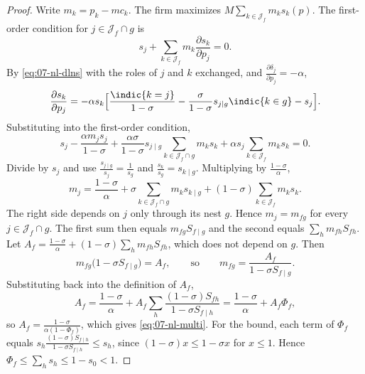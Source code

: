 \begin{proof}
Write $m_k = p_k - mc_k$. The firm maximizes $M\sum_{k\in\mathcal{J}_f}m_ks_k(p)$. The first-order condition for
$j \in \mathcal{J}_f \cap g$ is
\begin{equation*}
s_j + \sum_{k \in \mathcal{J}_f}m_k\frac{\partial s_k}{\partial p_j} = 0 .
\end{equation*}
By \eqref{eq:07-nl-dlns} with the roles of $j$ and $k$ exchanged, and $\frac{\partial\delta_j}{\partial p_j} = -\alpha$,
\begin{equation*}
\frac{\partial s_k}{\partial p_j} = -\alpha s_k\Big[\frac{\indic\{k = j\}}{1-\sigma} - \frac{\sigma}{1-\sigma}s_{j \mid g}\indic\{k \in g\} - s_j\Big] .
\end{equation*}
Substituting into the first-order condition,
\begin{equation*}
s_j - \frac{\alpha m_js_j}{1-\sigma} + \frac{\alpha\sigma}{1-\sigma}s_{j \mid g}\sum_{k\in\mathcal{J}_f\cap g}m_ks_k
+ \alpha s_j\sum_{k\in\mathcal{J}_f}m_ks_k = 0 .
\end{equation*}
Divide by $s_j$ and use $\frac{s_{j \mid g}}{s_j} = \frac{1}{s_g}$ and $\frac{s_k}{s_g} = s_{k \mid g}$. Multiplying by
$\frac{1-\sigma}{\alpha}$,
\begin{equation*}
m_j = \frac{1-\sigma}{\alpha} + \sigma\sum_{k\in\mathcal{J}_f\cap g}m_ks_{k \mid g} + (1-\sigma)\sum_{k\in\mathcal{J}_f}m_ks_k .
\end{equation*}
The right side depends on $j$ only through its nest $g$. Hence $m_j = m_{fg}$ for every
$j \in \mathcal{J}_f \cap g$. The first sum then equals $m_{fg}S_{f \mid g}$ and the second equals
$\sum_h m_{fh}S_{fh}$. Let $A_f = \frac{1-\sigma}{\alpha} + (1-\sigma)\sum_h m_{fh}S_{fh}$, which does not depend on
$g$. Then
\begin{equation*}
m_{fg}\big(1 - \sigma S_{f \mid g}\big) = A_f, \qquad\text{so}\qquad m_{fg} = \frac{A_f}{1 - \sigma S_{f \mid g}} .
\end{equation*}
Substituting back into the definition of $A_f$,
\begin{equation*}
A_f = \frac{1-\sigma}{\alpha} + A_f\sum_h\frac{(1-\sigma)S_{fh}}{1 - \sigma S_{f \mid h}} = \frac{1-\sigma}{\alpha} + A_f\Phi_f ,
\end{equation*}
so $A_f = \frac{1-\sigma}{\alpha(1 - \Phi_f)}$, which gives \eqref{eq:07-nl-multi}. For the bound, each term of
$\Phi_f$ equals $s_h\frac{(1-\sigma)S_{f \mid h}}{1 - \sigma S_{f \mid h}} \le s_h$, since $(1-\sigma)x \le 1 - \sigma x$ for
$x \le 1$. Hence $\Phi_f \le \sum_h s_h \le 1 - s_0 < 1$.
\end{proof}

